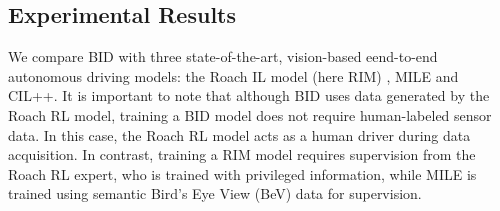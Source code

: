 \begin{table}
	\caption{Town05 results based on CARLA's offline metrics. 
		All models are tested on CARLA 0.9.13. 
		Mean values and standard deviations are computed from three runs with different random seeds.
		For metrics marked with $\uparrow$, higher values indicate better performance, while for those marked with $\downarrow$, lower values are preferred.}
	\centering
	\label{tab:T5_results}
\end{table}


\subsection{Experimental Results}
\label{sec:Results}
\hspace{1pc}We compare BID with three state-of-the-art, vision-based eend-to-end autonomous driving models: the Roach IL model (here RIM) \cite{Zhang:2021}, MILE \cite{Hu:2022} and CIL++\cite{xiao2023scaling}. 
It is important to note that although BID uses data generated by the Roach RL model, training a BID model does not require human-labeled sensor data. 
In this case, the Roach RL model acts as a human driver during data acquisition. 
In contrast, training a RIM model requires supervision from the Roach RL expert, who is trained with privileged information, while MILE is trained using semantic Bird’s Eye View (BeV) data for supervision.


